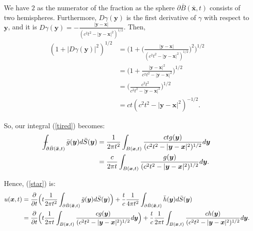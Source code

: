\documentclass[a4paper, 12pt]{article}
\def\Xint#1{\mathchoice
{\XXint\displaystyle\textstyle{#1}}%
{\XXint\textstyle\scriptstyle{#1}}%
{\XXint\scriptstyle\scriptscriptstyle{#1}}%
{\XXint\scriptscriptstyle\scriptscriptstyle{#1}}%
\!\int}
\def\XXint#1#2#3{{\setbox0=\hbox{$#1{#2#3}{\int}$ }
\vcenter{\hbox{$#2#3$ }}\kern-.6\wd0}}
\def\dashint{\Xint-}
\numberwithin{equation}{section}
\begin{document}
We have $2$ as the numerator of the fraction as the sphere
$\partial\bar{B}(\boldsymbol{\bar{x}}, t)$ consists of two hemispheres.
Furthermore, $D\gamma (\boldsymbol{y})$ is the first derivative of $\gamma$ with
respect to $\boldsymbol{y}$, and it is $D\gamma
(\boldsymbol{y})=-\frac{|\boldsymbol{y}-\boldsymbol{x}|}{(c^2
t^2-|\boldsymbol{y}-\boldsymbol{x}|^2)^{1/2}}$. Then,
\begin{equation*}
    \begin{aligned}
        (1+|D\gamma (\boldsymbol{y})|^2)^{1/2}&=\Big(1+\Big(\frac{|\boldsymbol{y}-\boldsymbol{x}|}{(c^2 t^2-|\boldsymbol{y}-\boldsymbol{x}|^2)^{1/2}}\Big)^2\Big)^{1/2}\\
        &=\Big(1+\frac{|\boldsymbol{y}-\boldsymbol{x}|^2}{c^2 t^2-|\boldsymbol{y}-\boldsymbol{x}|^2}\Big)^{1/2}\\
        &=\Big(\frac{c^2t^2}{c^2 t^2-|\boldsymbol{y}-\boldsymbol{x}|^2}\Big)^{1/2}\\
        &=ct(c^2 t^2-|\boldsymbol{y}-\boldsymbol{x}|^2)^{-1/2}.
    \end{aligned}
\end{equation*}

So, our integral (\ref{tired}) becomes:
\begin{equation*}
    \begin{aligned}
        \dashint_{\partial \bar{B}(\boldsymbol{\bar{x}}, t)} \bar{g}(\boldsymbol{y}) d\bar{S}(\boldsymbol{y})&=\frac{1}{2 \pi t^2}\int_{B(\boldsymbol{x},t)}\frac{ctg(\boldsymbol{y})}{(c^2 t^2-|\boldsymbol{y}-\boldsymbol{x}|^2)^{1/2}}d\boldsymbol{y}\\
        &=\frac{c}{2 \pi t}\int_{B(\boldsymbol{x},t)}\frac{g(\boldsymbol{y})}{(c^2 t^2-|\boldsymbol{y}-\boldsymbol{x}|^2)^{1/2}}d\boldsymbol{y}.
    \end{aligned}
\end{equation*}

Hence, (\ref{star}) is: 
\begin{equation*}
    \begin{aligned}
        u(\boldsymbol{x},t)&=\diffp[1]{}{t}\Big(t \frac{1}{2 \pi t^2} \int_{\partial \bar{B}(\boldsymbol{\bar{x}}, t)} \bar{g}(\boldsymbol{y})d\bar{S} (\boldsymbol{y})\Big)+ \frac{t}{c}\frac{1}{4 \pi t^2} \int_{\partial \bar{B}(\boldsymbol{\bar{x}}, t)} \bar{h}(\boldsymbol{y})d\bar{S}(\boldsymbol{y})\\
        &=\diffp[1]{}{t}\Big(t \frac{1}{2 \pi t} \int_{B(\boldsymbol{x}, t)} \frac{cg(\boldsymbol{y})}{(c^2 t^2-|\boldsymbol{y}-\boldsymbol{x}|^2)^{1/2}}d\boldsymbol{y}\Big)+\frac{t}{c}\frac{1}{2 \pi t} \int_{B(\boldsymbol{x}, t)} \frac{ch(\boldsymbol{y})}{(c^2 t^2-|\boldsymbol{y}-\boldsymbol{x}|^2)^{1/2}}d\boldsymbol{y}.
    \end{aligned}
\end{equation*}
\end{document}
